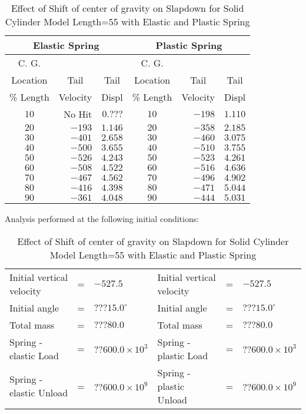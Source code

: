 \begin{table}
\begin{center}
\caption{Effect of Shift of center of gravity on Slapdown for Solid
Cylinder Model Length=55 with Elastic and Plastic Spring}
\makeqnum
\begin{tabular}{||c|r|r|c|r|r||}
\hline
\multicolumn{3}{||c|}{Elastic Spring} &\multicolumn{3}{c||}{Plastic
Spring}\\
\hline
\multicolumn{1}{||c|}{C. G.}
& &
&\multicolumn{1}{c|}{C. G.}
& &\\
\multicolumn{1}{||c|}{Location}
&\multicolumn{1}{c|}{Tail}
&\multicolumn{1}{c|}{Tail}
&\multicolumn{1}{c|}{Location}
&\multicolumn{1}{c|}{Tail}
&\multicolumn{1}{c||}{Tail}\\
\multicolumn{1}{||c|}{\% Length}
&\multicolumn{1}{c|}{Velocity}
&\multicolumn{1}{c|}{Displ}
&\multicolumn{1}{c|}{\% Length}
&\multicolumn{1}{c|}{Velocity}
&\multicolumn{1}{c||}{Displ}\\
$10$ &No Hit &$0.???$ &$10$ &$-198$ &$1.110$\\
$20$ &$-193$ &$1.146$ &$20$ &$-358$ &$2.185$\\
$30$ &$-401$ &$2.658$ &$30$ &$-460$ &$3.075$\\
$40$ &$-500$ &$3.655$ &$40$ &$-510$ &$3.755$\\
$50$ &$-526$ &$4.243$ &$50$ &$-523$ &$4.261$\\
$60$ &$-508$ &$4.522$ &$60$ &$-516$ &$4.636$\\
$70$ &$-467$ &$4.562$ &$70$ &$-496$ &$4.902$\\
$80$ &$-416$ &$4.398$ &$80$ &$-471$ &$5.044$\\
$90$ &$-361$ &$4.048$ &$90$ &$-444$ &$5.031$\\
\hline
\end{tabular}
\end{center}

Analysis performed at the following initial conditions:

\makeqnum
\begin{tabular}{llllll}
Initial vertical velocity &= &$-527.5$
&Initial vertical velocity &= &$-527.5$\\
Initial angle &= &$???15.0^\circ$ &Initial angle &= &$???15.0^\circ$\\
Total mass &= &$???80.0$ &Total mass &= &$???80.0$\\
Spring - elastic     Load &=  &$??600.0\times10^3$
&Spring - plastic     Load &= &$??600.0\times10^3$\\
Spring - elastic   Unload &=  &$??600.0\times10^9$
&Spring - plastic   Unload &=  &$??600.0\times10^9$\\
\end{tabular}
\end{table}

